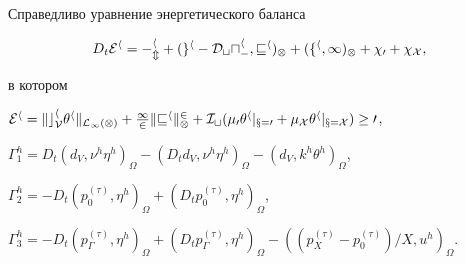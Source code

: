 \documentclass[12pt]{article}
\theoremstyle{plain} %
\newtheorem{lemm}{\hskip\parindent Лемма}[section]
\theoremstyle{definition}
\numberwithin{equation}{section}
\begin{document}
\begin{lemm} Справедливо уравнение энергетического баланса


\begin{equation}


D_t\cal E^h =


 \Gamma_m^h + (g^h - D_tu^h_{\Gamma},v^h)_\Omega


+(f^h,1)_\Omega +\chi_0+\chi_X,


\end{equation}


в котором


$\cal E^h = \| c_V^h\theta^h\|_{L_1(\Omega)} +


\frac{1}{2}\|v^h\|_{\Omega}^2+I_t(\mu_0\theta^h|_{x=0}+


\mu_X\theta^h|_{x=X})\ge 0$,


$\Gamma_1^h=D_t(d_V,\nu^h \eta^h)_\Omega - (D_td_V,\nu^h\eta^h)_\Omega


-(d_V,k^h \theta^h)_{\Omega}$,


$\Gamma_2^h = -D_t(p^{(\tau)}_0,\eta^h)_{\Omega}+


(D_tp^{(\tau)}_0,\eta^h)_{\Omega}$,


$\Gamma_3^h = -D_t(p^{(\tau)}_\Gamma,\eta^h)_{\Omega}+


(D_tp^{(\tau)}_\Gamma,\eta^h)_{\Omega}-


((p^{(\tau)}_X-p^{(\tau)}_0 )/X,u^h)_{\Omega}$.


\end{lemm}
\end{document}
